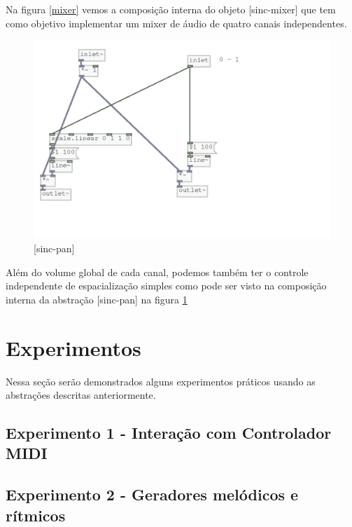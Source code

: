 \documentclass[draft]{ppgmus}
\begin{document}
Na figura \ref{mixer} vemos a composição interna do objeto
[sinc-mixer] que tem como objetivo implementar um mixer
de áudio de quatro canais independentes.

\begin{figure}
\includegraphics[scale=.4]{pan}
\caption{[sinc-pan]}
\label{pan}
\end{figure}

Além do volume global de cada canal, podemos também ter o controle
independente de espacialização simples como pode ser visto
na composição interna da abstração [sinc-pan] na figura \ref{pan}


\section {Experimentos}

Nessa seção serão demonstrados alguns experimentos práticos usando as abstrações
descritas anteriormente.

\subsection{Experimento 1 - Interação com Controlador MIDI}





\subsection{Experimento 2 - Geradores melódicos e rítmicos}
\end{document}
